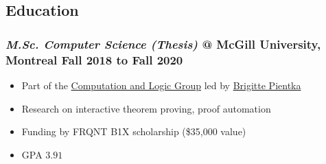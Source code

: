 \documentclass{article}
\newcommand\jobtitle\textit
\providecommand{\tightlist}{%
  \setlength{\itemsep}{0pt}\setlength{\parskip}{0pt}}
\begin{document}

\subsection*{Education}

\subsubsection*{
  \jobtitle{M.Sc. Computer Science (Thesis)} @ McGill University, Montreal
  \hfill Fall 2018 to Fall 2020
}
\begin{itemize}\tightlist
  \item Part of the \href{http://cs.mcgill.ca/~complogic}{Computation and Logic Group} led by
    \href{http://www.cs.mcgill.ca/~bpientka/}{Brigitte Pientka}
  \item Research on interactive theorem proving, proof automation
  \item Funding by FRQNT B1X scholarship (\$35,000 value)
  \item GPA $3.91$
\end{itemize}
\end{document}

